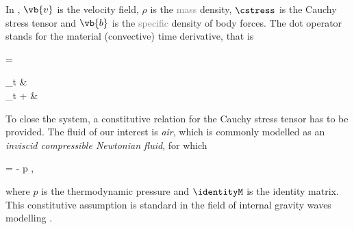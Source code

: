 \documentclass[../main.tex]{subfiles}
\begin{document}
In ,  $\vb{v}$ is the velocity field, $\rho$ is the \textcolor{gray}{mass} density, $\cstress$ is the Cauchy stress tensor and $\vb{b}$ is the \textcolor{gray}{specific} density of body forces. The dot operator stands for the material (convective) time derivative, that is 

\begin{equations}[single,*]
	\tdot{\varphi} = \begin{cases} \partial_t \varphi &  \\ \partial_t \varphi +  \cdot \grad \varphi &  \end{cases}
\end{equations} 


To close the system, a constitutive relation for the Cauchy stress tensor has to be provided. The fluid of our interest is \emph{air}, which is commonly modelled as an \emph{inviscid compressible Newtonian fluid}, for which

\begin{equations}[single,!,numberline=all]
\label{eq:CAUCHY}
\cstress = - p \identityM,
\end{equations}

where $p$ is the thermodynamic pressure and $\identityM$ is the identity matrix. This constitutive assumption is standard in the field of internal gravity waves modelling \autocite{teixeiraPhysicsOrographicGravity2014,smithInfluenceMountainsAtmosphere1979,frittsGravityWaveDynamics2003,doyleIntercomparisonTREXMountainwave2011}. 
\end{document}
